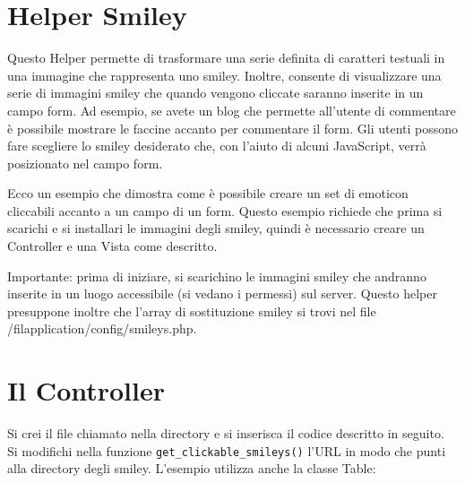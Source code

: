 \section{Helper Smiley}
\label{helper:smiley}

Questo Helper permette di trasformare una serie definita di caratteri testuali in una immagine che rappresenta uno smiley. Inoltre, consente di visualizzare una serie di immagini smiley che quando vengono cliccate saranno inserite in un campo form. Ad esempio, se avete un blog che permette all'utente di commentare è possibile mostrare le faccine accanto per commentare il form. Gli utenti possono fare scegliere lo smiley desiderato che, con l'aiuto di alcuni JavaScript, verrà posizionato nel campo form.

Ecco un esempio che dimostra come è possibile creare un set di emoticon cliccabili accanto a un campo di un form. Questo esempio richiede che prima si scarichi e si installari le immagini degli smiley, quindi è necessario creare un Controller e una Vista come descritto.

Importante: prima di iniziare, si scarichino le immagini smiley che andranno inserite in un luogo accessibile (si vedano i permessi) sul server. Questo helper presuppone inoltre che l'array di sostituzione smiley si trovi nel file /fil{application/config/smileys.php}.

\section*{Il Controller}
Si crei il file chiamato  nella directory  e si inserisca il codice descritto in seguito. Si modifichi nella funzione \verb|get_clickable_smileys()| l'URL in modo che punti alla directory degli smiley. L'esempio utilizza anche la classe Table:


